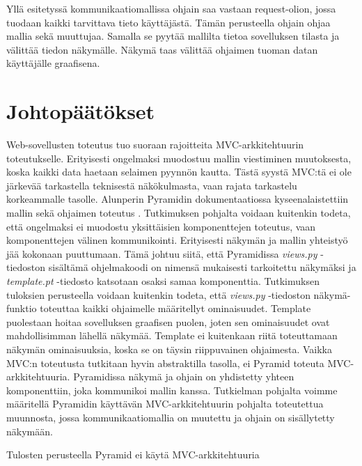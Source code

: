 \documentclass[finnish,utf8,nonumbib,palatino,kandi]{gradu2}
\begin{document}
Yllä esitetyssä kommunikaatiomallissa ohjain saa vastaan request-olion, jossa tuodaan kaikki tarvittava tieto käyttäjästä. Tämän perusteella ohjain ohjaa mallia
sekä muuttujaa. Samalla se pyytää mallilta tietoa sovelluksen tilasta ja välittää tiedon näkymälle. Näkymä taas välittää ohjaimen tuoman datan käyttäjälle graafisena.


\section{Johtopäätökset}
Web-sovellusten toteutus tuo suoraan rajoitteita MVC-arkkitehtuurin toteutukselle. Erityisesti ongelmaksi muodostuu mallin viestiminen muutoksesta, koska kaikki data haetaan selaimen pyynnön kautta. Tästä
syystä MVC:tä ei ole järkevää tarkastella teknisestä näkökulmasta, vaan rajata tarkastelu korkeammalle tasolle.
Alunperin Pyramidin dokumentaatiossa kyseenalaistettiin mallin sekä ohjaimen toteutus \cite{Pyramid:intr}. Tutkimuksen pohjalta voidaan kuitenkin
todeta, että ongelmaksi ei muodostu yksittäisien komponenttejen toteutus, vaan komponenttejen välinen kommunikointi. Erityisesti näkymän ja mallin yhteistyö jää
kokonaan puuttumaan. Tämä johtuu siitä, että Pyramidissa \emph{views.py} -tiedoston sisältämä ohjelmakoodi on nimensä mukaisesti tarkoitettu näkymäksi ja
\emph{template.pt} -tiedosto katsotaan osaksi samaa komponenttia. Tutkimuksen tuloksien perusteella voidaan kuitenkin todeta, että \emph{views.py} -tiedoston näkymä-funktio toteuttaa kaikki
ohjaimelle määritellyt ominaisuudet. Template puolestaan hoitaa sovelluksen graafisen puolen, joten sen ominaisuudet ovat mahdollisimman lähellä näkymää. Template ei kuitenkaan riitä toteuttamaan näkymän ominaisuuksia, koska se on täysin riippuvainen ohjaimesta. 
Vaikka MVC:n toteutusta tutkitaan hyvin abstraktilla tasolla, ei Pyramid toteuta MVC-arkkitehtuuria. Pyramidissa näkymä ja ohjain on yhdistetty yhteen komponenttiin, joka kommunikoi mallin kanssa. Tutkielman pohjalta voimme määritellä Pyramidin käyttävän MVC-arkkitehtuurin pohjalta toteutettua muunnosta, jossa kommunikaatiomallia on muutettu ja ohjain on sisällytetty näkymään. 


Tulosten perusteella Pyramid ei käytä MVC-arkkitehtuuria
\end{document}
